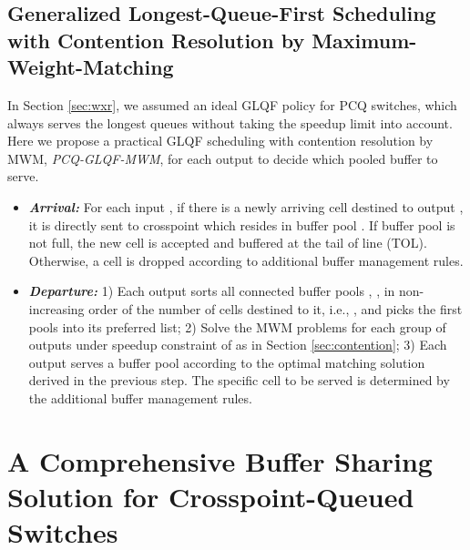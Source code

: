 \documentclass[journal,final,doublecolumn,10pt,twoside]{IEEEtranTCOM} \normalsize
\begin{document}
\subsection{Generalized Longest-Queue-First Scheduling with Contention Resolution by Maximum-Weight-Matching}



In Section \ref{sec:wxr}, we assumed an ideal GLQF policy for PCQ switches, which always serves the longest queues without taking the speedup limit into account. Here we propose a practical GLQF scheduling with contention resolution by MWM, \emph{PCQ-GLQF-MWM}, for each output  to decide which pooled buffer  to serve.
\begin{itemize}
\item
\textbf{\emph{Arrival:}} For each input , if there is a newly arriving cell destined to output , it is directly sent to crosspoint  which resides in buffer pool . If buffer pool is not full, the new cell is accepted and buffered at the tail of line (TOL). Otherwise, a cell is dropped according to additional buffer management rules.

\item
\textbf{\emph{Departure:}} 
1) Each output  sorts all connected buffer pools , , in non-increasing order of the number of cells destined to it, i.e., , and picks the first  pools into its preferred list;
2) Solve the MWM problems for each group of  outputs under speedup constraint of  as in Section \ref{sec:contention};
3) Each output  serves a buffer pool according to the optimal matching solution  derived in the previous step. The specific cell to be served is determined by the additional buffer management rules.
\end{itemize}




\section{A Comprehensive Buffer Sharing Solution for Crosspoint-Queued Switches}
\label{sec:framework}
\end{document}
